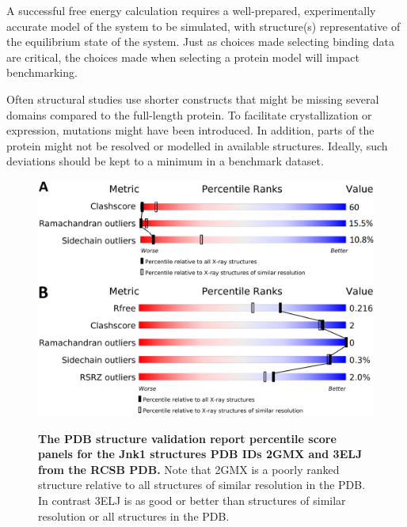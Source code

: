 \documentclass[9pt,bestpractices,pubversion]{livecoms}
\begin{document}
A successful free energy calculation requires a well-prepared, experimentally accurate model of the system to be simulated, with structure(s) representative of the equilibrium state of the system. 
Just as choices made selecting binding data are critical, the choices made when selecting a protein model will impact benchmarking.

Often structural studies use shorter constructs that might be missing several domains compared to the full-length protein. To facilitate crystallization or expression, mutations might have been introduced. In addition, parts of the protein might not be resolved or modelled in available structures. Ideally, such deviations should be kept to a minimum in a benchmark dataset.
%

\begin{figure}[!ht]
    \centering
    \includegraphics[width=.47\textwidth]{figures/crystal/pdb_validation.png}
    {
        \label{fig:jnk1_pdb_report_2gmx}
        \label{fig:jnk1_pdb_report_3eljx}
    }
    
    \caption{\textbf{The PDB structure validation report percentile score panels for the Jnk1 structures PDB IDs 2GMX and 3ELJ from the RCSB PDB.} \textbf{} Note that 2GMX is a poorly ranked structure relative to all structures of similar resolution in the PDB.  
    \textbf{} In contrast 3ELJ is as good or better than structures of similar resolution or all structures in the PDB.}
    \label{fig:jnk1_pdb_report}
\end{figure}
\end{document}
